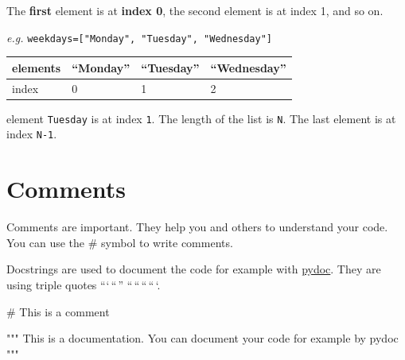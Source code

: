 \documentclass[
  letterpaper,
  DIV=11,
  numbers=noendperiod]{scrreprt}
\newenvironment{Shaded}{\begin{snugshade}}{\end{snugshade}}
\newcommand{\CommentTok}[1]{\textcolor[rgb]{0.37,0.37,0.37}{#1}}
\begin{document}
\begin{tcolorbox}[enhanced jigsaw, leftrule=.75mm, bottomrule=.15mm, colbacktitle=quarto-callout-important-color!10!white, title=\textcolor{quarto-callout-important-color}{\faExclamation}\hspace{0.5em}{Python counts from 0.}, breakable, arc=.35mm, toptitle=1mm, opacityback=0, titlerule=0mm, coltitle=black, colback=white, opacitybacktitle=0.6, colframe=quarto-callout-important-color-frame, left=2mm, rightrule=.15mm, toprule=.15mm, bottomtitle=1mm]

The \textbf{first} element is at \textbf{index 0}, the second element is
at index 1, and so on.

\emph{e.g.} \texttt{weekdays={[}"Monday",\ "Tuesday",\ "Wednesday"{]}}

\begin{longtable}[]{@{}llll@{}}
\toprule\noalign{}
elements & ``Monday'' & ``Tuesday'' & ``Wednesday'' \\
\midrule\noalign{}
\endhead
\bottomrule\noalign{}
\endlastfoot
index & 0 & 1 & 2 \\
\end{longtable}

element \texttt{Tuesday} is at index \texttt{1}. The length of the list
is \texttt{N}. The last element is at index \texttt{N-1}.

\end{tcolorbox}

\section*{Comments}\label{comments}


Comments are important. They help you and others to understand your
code. You can use the \# symbol to write comments.

Docstrings are used to document the code for example with
\href{https://docs.python.org/3/library/pydoc.html}{pydoc}. They are
using triple quotes ```\,``\,'' ``\,``\,``\,``\,`.

\begin{Shaded}
\begin{Highlighting}[]
\CommentTok{\# This is a comment}

\CommentTok{"""}
\CommentTok{This is a documentation.}
\CommentTok{You can document your code for example by pydoc}
\CommentTok{"""}
\end{Highlighting}
\end{Shaded}
\end{document}
